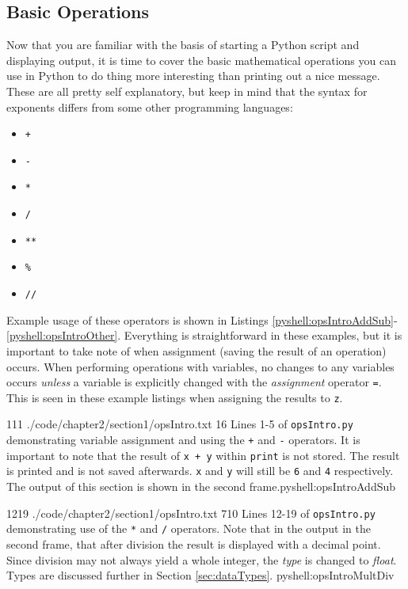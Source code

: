 \documentclass[oneside]{book}
\begin{document}
\subsection{Basic Operations}
\label{sec:ops}
Now that you are familiar with the basis of starting a Python script and displaying output, it is time to cover the basic mathematical operations you can use in Python to do thing more interesting than printing out a nice message. These are all pretty self explanatory, but keep in mind that the syntax for exponents differs from some other programming languages:
\begin{itemize}
\item{ \texttt{+}}
\item{ \texttt{-}}
\item{ \texttt{*}}
\item{ \texttt{/}}
\item{ \texttt{**}}
\item{ \texttt{\%}}
\item{ \texttt{//}}
\end{itemize}

Example usage of these operators is shown in Listings \ref{pyshell:opsIntroAddSub}-\ref{pyshell:opsIntroOther}. Everything is straightforward in these examples, but it is important to take note of when assignment (saving the result of an operation) occurs. When performing operations with variables, no changes to any variables occurs \textit{unless} a variable is explicitly changed with the \textit{assignment} operator \texttt{=}. This is seen in these example listings when assigning the results to \texttt{z}.

{1}{11}
{./code/chapter2/section1/opsIntro.txt}
{1}{6}
{Lines 1-5 of \texttt{opsIntro.py} demonstrating variable assignment and using the \texttt{+} and \texttt{-} operators. It is important to note that the result of \texttt{x + y} within \texttt{print} is not stored. The result is printed and is not saved afterwards. \texttt{x} and \texttt{y} will still be \texttt{6} and \texttt{4} respectively. The output of this section is shown in the second frame.}{pyshell:opsIntroAddSub}

{12}{19}
{./code/chapter2/section1/opsIntro.txt}
{7}{10}
{Lines 12-19 of \texttt{opsIntro.py} demonstrating use of the \texttt{*} and \texttt{/} operators. Note that in the output in the second frame, that after division the result is displayed with a decimal point. Since division may not always yield a whole integer, the \textit{type} is changed to \textit{float}. Types are discussed further in Section \ref{sec:dataTypes}.}
{pyshell:opsIntroMultDiv}
\end{document}
